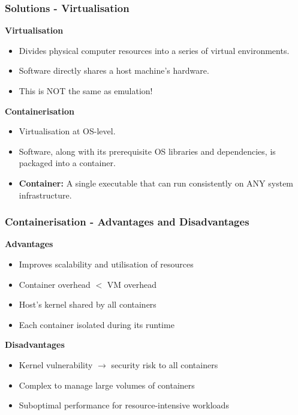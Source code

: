 
\begin{frame}
\frametitle{Solutions - Virtualisation}
\begin{redbox}
\textbf{Virtualisation}
\begin{itemize}
    \item Divides physical computer resources into a series of virtual environments. \cite{virtualization-wikipedia}
    \item Software directly shares a host machine's hardware.
    \item This is NOT the same as emulation! \cite{virtualization-wikipedia}
\end{itemize}
\end{redbox}
\begin{yellowbox}
\textbf{Containerisation}
\begin{itemize}
    \item Virtualisation at OS-level. \cite{containers}
    \item Software, along with its prerequisite OS libraries and dependencies, is packaged into a container. \cite{containers}
    \item \textbf{Container:} A single executable that can run consistently on ANY system infrastructure. \cite{containers}
\end{itemize}
\end{yellowbox}

\end{frame}

\begin{frame}
\frametitle{Containerisation - Advantages and Disadvantages}
\begin{theorembox}
\textbf{Advantages}
\begin{itemize}
    \item Improves scalability and utilisation of resources \cite{baresi-containers}
    \item Container overhead $<$ VM overhead \cite{baresi-containers}
    \item Host's kernel shared by all containers \cite{kernels}
    \item Each container isolated during its runtime \cite{kernels}
\end{itemize}
\end{theorembox}
\begin{redbox}
\textbf{Disadvantages}
\begin{itemize}
    \item Kernel vulnerability $\rightarrow$ security risk to all containers \cite{kernel-risk}
    \item Complex to manage large volumes of containers
    \item Suboptimal performance for resource-intensive workloads \cite{baresi-containers}
\end{itemize}
\end{redbox}
\end{frame}

